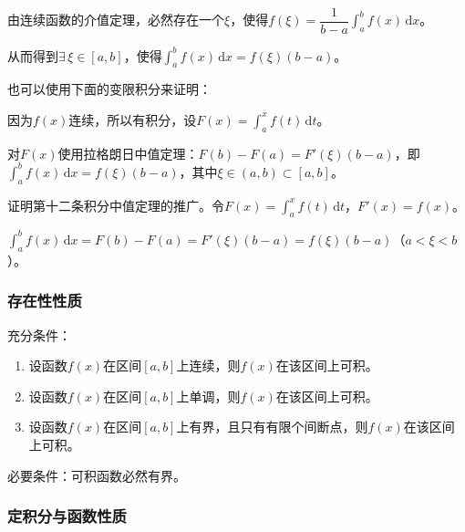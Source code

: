 \documentclass[UTF8, 12pt]{ctexart}
\begin{document}
由连续函数的介值定理，必然存在一个$\xi$，使得$f(\xi)=\dfrac{1}{b-a}\int_a^bf(x)\,\textrm{d}x$。

从而得到$\exists\,\xi\in[a,b]$，使得$\int_a^bf(x)\,\textrm{d}x=f(\xi)(b-a)$。

也可以使用下面的变限积分来证明：

因为$f(x)$连续，所以有积分，设$F(x)=\int_a^xf(t)\,\textrm{d}t$。

对$F(x)$使用拉格朗日中值定理：$F(b)-F(a)=F'(\xi)(b-a)$，即$\int_a^bf(x)\,\textrm{d}x=f(\xi)(b-a)$，其中$\xi\in(a,b)\subset[a,b]$。

证明第十二条积分中值定理的推广。令$F(x)=\int_a^xf(t)\,\textrm{d}t$，$F'(x)=f(x)$。

$\int_a^bf(x)\,\textrm{d}x=F(b)-F(a)=F'(\xi)(b-a)=f(\xi)(b-a)$（$a<\xi<b$）。

\subsubsection{存在性性质}

充分条件：

\begin{enumerate}
    \item 设函数$f(x)$在区间$[a,b]$上连续，则$f(x)$在该区间上可积。
    \item 设函数$f(x)$在区间$[a,b]$上单调，则$f(x)$在该区间上可积。
    \item 设函数$f(x)$在区间$[a,b]$上有界，且只有有限个间断点，则$f(x)$在该区间上可积。
\end{enumerate}

必要条件：可积函数必然有界。

\subsubsection{定积分与函数性质}
\end{document}
